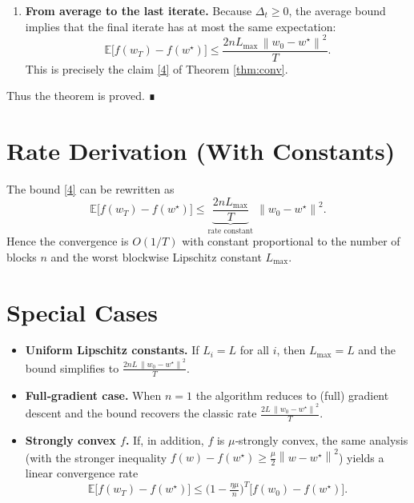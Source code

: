 \documentclass[11pt]{article}
\newcommand{\E}{\mathbb{E}}
\newcommand{\norm}[1]{\left\|#1\right\|}
\begin{document}
\begin{enumerate}
\item[Step 12.] \textbf{From average to the last iterate.}
Because $\Delta_{t}\ge0$, the average bound implies that the final iterate
has at most the same expectation:
\[
\E\!\bigl[f(w_{T})-f(w^{\star})\bigr]\le
\frac{2nL_{\max}\,\norm{w_{0}-w^{\star}}^{2}}{T}.
\tag{21}
\]
This is precisely the claim \eqref{4} of Theorem \ref{thm:conv}.
\end{enumerate}
Thus the theorem is proved. ∎

\section*{Rate Derivation (With Constants)}
The bound \eqref{4} can be rewritten as
\[
\E\!\bigl[f(w_{T})-f(w^{\star})\bigr]\le
\underbrace{\frac{2nL_{\max}}{T}}_{\displaystyle\text{rate constant}}
\;\norm{w_{0}-w^{\star}}^{2}.
\]
Hence the convergence is $O(1/T)$ with constant proportional to the number of
blocks $n$ and the worst blockwise Lipschitz constant $L_{\max}$.

\section*{Special Cases}
\begin{itemize}
\item \textbf{Uniform Lipschitz constants.} If $L_{i}=L$ for all $i$, then
$L_{\max}=L$ and the bound simplifies to
$\frac{2nL\,\norm{w_{0}-w^{\star}}^{2}}{T}$.

\item \textbf{Full‑gradient case.} When $n=1$ the algorithm reduces to (full)
gradient descent and the bound recovers the classic rate
$\frac{2L\,\norm{w_{0}-w^{\star}}^{2}}{T}$.

\item \textbf{Strongly convex $f$.} If, in addition, $f$ is $\mu$‑strongly convex,
the same analysis (with the stronger inequality
$f(w)-f(w^{\star})\ge \frac{\mu}{2}\norm{w-w^{\star}}^{2}$) yields a linear
convergence rate
\[
\E\!\bigl[f(w_{T})-f(w^{\star})\bigr]\le
\bigl(1-\tfrac{\eta\mu}{n}\bigr)^{T}\bigl[f(w_{0})-f(w^{\star})\bigr].
\]
\end{itemize}
\end{document}
